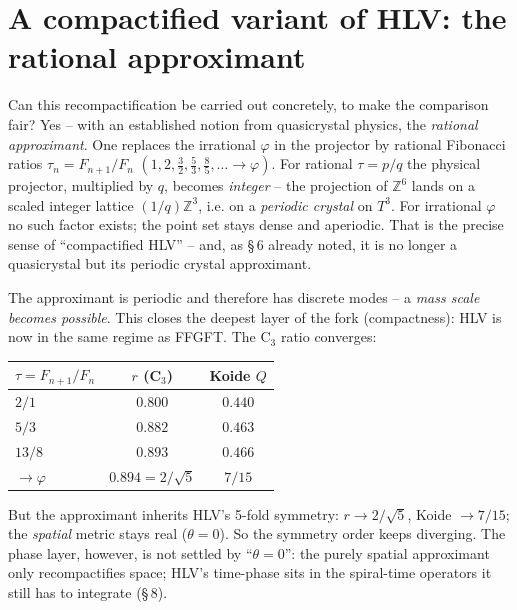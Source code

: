 \section{A compactified variant of HLV: the rational approximant}

Can this recompactification be carried out concretely, to make the comparison
fair? Yes -- with an established notion from quasicrystal physics, the
\emph{rational approximant}. One replaces the irrational $\varphi$ in the projector
by rational Fibonacci ratios $\tau_n=F_{n+1}/F_n$
$(1,2,\tfrac32,\tfrac53,\tfrac85,\dots\to\varphi)$. For rational $\tau=p/q$ the
physical projector, multiplied by $q$, becomes \emph{integer} -- the projection of
$\mathbb{Z}^6$ lands on a scaled integer lattice $(1/q)\mathbb{Z}^3$, i.e. on a
\emph{periodic crystal} on $T^3$. For irrational $\varphi$ no such factor exists;
the point set stays dense and aperiodic. That is the precise sense of
``compactified HLV'' -- and, as §\,6 already noted, it is no longer a quasicrystal
but its periodic crystal approximant.

The approximant is periodic and therefore has discrete modes -- a \emph{mass scale
becomes possible}. This closes the deepest layer of the fork (compactness): HLV is
now in the same regime as FFGFT. The C$_3$ ratio converges:

\begin{center}
\begin{tabular}{lcc}
\toprule
$\tau=F_{n+1}/F_n$ & $r$ (C$_3$) & Koide $Q$ \\
\midrule
$2/1$ & $0.800$ & $0.440$ \\
$5/3$ & $0.882$ & $0.463$ \\
$13/8$ & $0.893$ & $0.466$ \\
$\to\varphi$ & $0.894=2/\sqrt5$ & $7/15$ \\
\bottomrule
\end{tabular}
\end{center}

But the approximant inherits HLV's 5-fold symmetry: $r\to2/\sqrt5$, Koide
$\to7/15$; the \emph{spatial} metric stays real ($\theta=0$). So the symmetry order
keeps diverging. The phase layer, however, is not settled by ``$\theta=0$'': the
purely spatial approximant only recompactifies space; HLV's time-phase sits in the
spiral-time operators it still has to integrate (§\,8).

